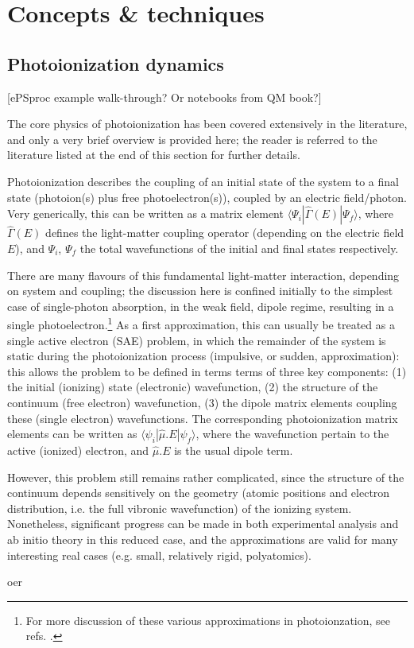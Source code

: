 \section{Concepts \& techniques}

\subsection{Photoionization dynamics} 
[ePSproc example walk-through? Or notebooks from QM book?]

The core physics of photoionization has been covered extensively in the literature, and only a very brief overview is provided here; the reader is referred to the literature listed at the end of this section for further details.

Photoionization describes the coupling of an initial state of the system to a final state (photoion(s) plus free photoelectron(s)), coupled by an electric field/photon. Very generically, this can be written as a matrix element $\langle\Psi_i|\hat{\Gamma}(E)|\Psi_f\rangle$, where $\hat{\Gamma}(E)$ defines the light-matter coupling operator (depending on the electric field $E$), and $\Psi_i$, $\Psi_f$ the total wavefunctions of the initial and final states respectively. 

There are many flavours of this fundamental light-matter interaction, depending on system and coupling; the discussion here is confined initially to the simplest case of single-photon absorption, in the weak field, dipole regime, resulting in a single photoelectron.\footnote{For more discussion of these various approximations in photoionzation, see refs. \cite{Seideman2002,Seideman2001}.} As a first approximation, this can usually be treated as a single active electron (SAE) problem, in which the remainder of the system is static during the photoionization process (impulsive, or sudden, approximation): this allows the problem to be defined in terms terms of three key components: (1) the initial (ionizing) state (electronic) wavefunction, (2) the structure of the continuum (free electron) wavefunction, (3) the dipole matrix elements coupling these (single electron) wavefunctions. The corresponding photoionization matrix elements can be written as $\langle\psi_i|\hat{\mu}.E|\psi_f\rangle$, where the wavefunction pertain to the active (ionized) electron, and $\hat{\mu}.E$ is the usual dipole term.

However, this problem still remains rather complicated, since the structure of the continuum depends sensitively on the geometry (atomic positions and electron distribution, i.e. the full vibronic wavefunction) of the ionizing system. Nonetheless, significant progress can be made in both experimental analysis and ab initio theory in this reduced case, and the approximations are valid for many interesting real cases (e.g. small, relatively rigid, polyatomics).

oer

